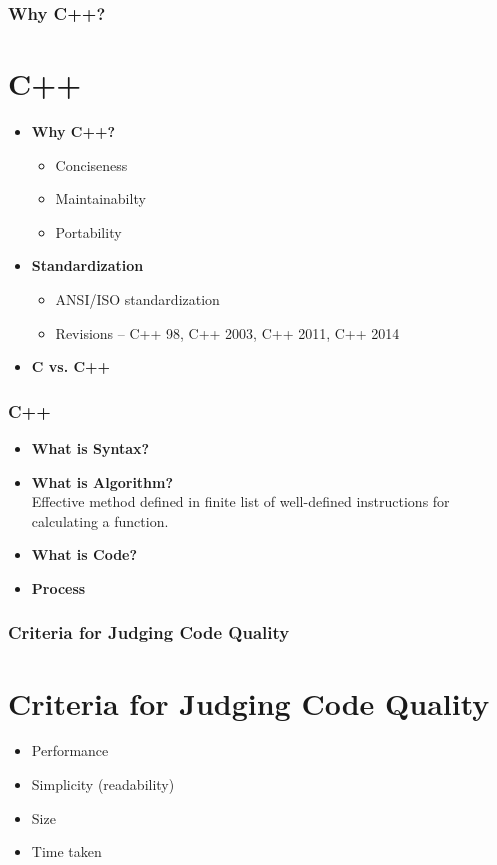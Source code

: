 \documentclass{beamer}
\begin{document}
\begin{frame}
    \frametitle{Why C++?}
    \section{C++} %
    \label{sec:why_c}
    \begin{itemize}
        \item \textbf{Why C++?}
            \begin{itemize}
                \item Conciseness
                \item Maintainabilty
                \item Portability
            \end{itemize}
        \item \textbf{Standardization}
            \begin{itemize}
                \item ANSI/ISO standardization
                \item Revisions -- C++ 98, C++ 2003, C++ 2011, C++ 2014
            \end{itemize}
        \item \textbf{C vs. C++}
    \end{itemize}
\end{frame}

\begin{frame}
    \frametitle{C++}
    \begin{itemize}
        \item \textbf{What is Syntax?}
        \item \textbf{What is Algorithm?} \\
        Effective method defined in finite list of well-defined instructions for calculating a function.
        \item \textbf{What is Code?}
        \item \textbf{Process}
    \end{itemize}
\end{frame}

\begin{frame}
    \frametitle{Criteria for Judging Code Quality}
    \section{Criteria for Judging Code Quality} %
    \label{sec:criteria_for_judging_code_quality}
    \begin{itemize}
        \item Performance
        \item Simplicity (readability)
        \item Size
        \item Time taken
    \end{itemize}
\end{frame}
\end{document}
